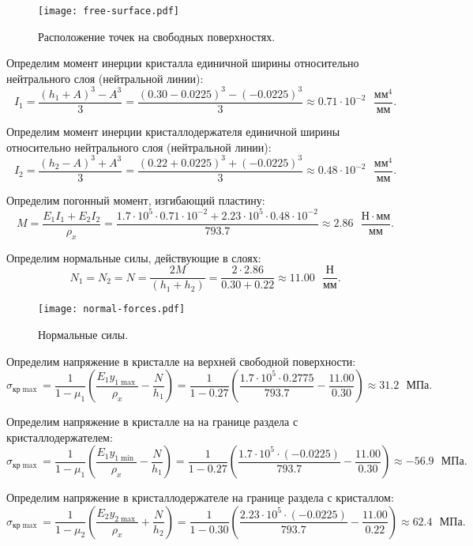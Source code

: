 \begin{figure}[h]
    \centering
    \texttt{[image: free-surface.pdf]}
    \caption{Расположение точек на свободных поверхностях.}
    \label{fig:free-surface}
\end{figure}

Определим момент инерции кристалла единичной ширины относительно нейтрального слоя (нейтральной линии):
\[
    I_1 = \frac{(h_1 + A)^3 - A^3}{3}
        = \frac{(0.30 - 0.0225)^3 - (-0.0225)^3}{3}
        \approx 0.71 \cdot 10^{-2} \text{ } \frac{мм^4}{мм}.
\]

Определим момент инерции кристаллодержателя единичной ширины относительно нейтрального слоя (нейтральной линии):
\[
    I_2 = \frac{(h_2 - A)^3 + A^3}{3}
        = \frac{(0.22 + 0.0225)^3 + (-0.0225)^3}{3}
        \approx 0.48 \cdot 10^{-2} \text{ } \frac{мм^4}{мм}.
\]

Определим погонный момент, изгибающий пластину:
\[
    M = \frac{E_1 I_1 + E_2 I_2}{\rho_x}
      = \frac{1.7 \cdot 10^5 \cdot 0.71 \cdot 10^{-2} + 2.23 \cdot 10^5 \cdot 0.48 \cdot 10^{-2}}{793.7}
      \approx 2.86 \text{ } \frac{Н \cdot мм}{мм}.
\]

Определим нормальные силы, действующие в слоях:
\[
    N_1 = N_2 = N
        = \frac{2M}{(h_1 + h_2)}
        = \frac{2 \cdot 2.86}{0.30 + 0.22}
        \approx 11.00 \text{ } \frac{Н}{мм}.
\]

\begin{figure}[h]
    \centering
    \texttt{[image: normal-forces.pdf]}
    \caption{Нормальные силы.}
    \label{fig:normal-forces}
\end{figure}

Определим напряжение в кристалле на верхней свободной поверхности:
\[
    \sigma_{кр \max} = \frac{1}{1 - \mu_1} \left(\frac{E_1 y_{1\max}}{\rho_x} - \frac{N}{h_1}\right)
                     = \frac{1}{1 - 0.27} \left(\frac{1.7 \cdot 10^5 \cdot 0.2775}{793.7} - \frac{11.00}{0.30}\right)
                     \approx 31.2 \text{ } МПа.
\]

Определим напряжение в кристалле на на границе раздела с кристаллодержателем:
\[
    \sigma_{кр \max} = \frac{1}{1 - \mu_1} \left(\frac{E_1 y_{1\min}}{\rho_x} - \frac{N}{h_1}\right)
                     = \frac{1}{1 - 0.27} \left(\frac{1.7 \cdot 10^5 \cdot (-0.0225)}{793.7} - \frac{11.00}{0.30}\right)
                     \approx -56.9\text{ } МПа.
\]

Определим напряжение в кристаллодержателе на границе раздела с кристаллом:
\[
    \sigma_{кр \max} = \frac{1}{1 - \mu_2} \left(\frac{E_2 y_{2\max}}{\rho_x} + \frac{N}{h_2}\right)
                     = \frac{1}{1 - 0.30} \left(\frac{2.23 \cdot 10^5 \cdot (-0.0225)}{793.7} - \frac{11.00}{0.22}\right)
                     \approx 62.4\text{ } МПа.
\]

